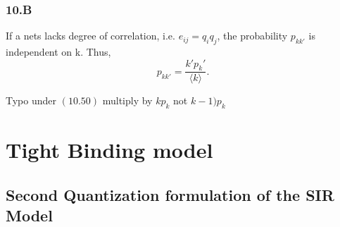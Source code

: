 \documentclass[a4paper,11pt,twoside]{report} %
\begin{document}
\subsection{10.B}

If a nets lacks degree of correlation, i.e. $e_{ij}=q_iq_j$, the probability $p_{kk'}$ is independent on k. Thus, $$p_{kk'}=\frac{k'p_k'}{\langle k\rangle}.$$

Typo under $(10.50)$ multiply by $kp_k$ not $k-1)p_k$





\clearpage


\chapter{Tight Binding model}


\section{Second Quantization formulation of the SIR Model}





\end{document}
